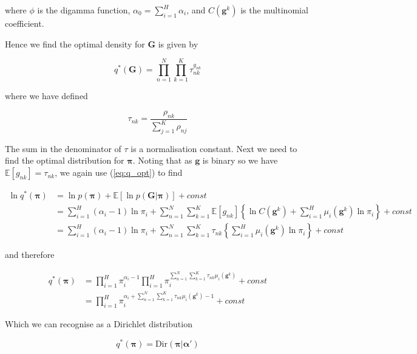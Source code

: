 \documentclass{article}
\begin{document}
where $\phi$ is the digamma function, $\alpha_0 = \sum_{i = 1}^H \alpha_i$, and $C(\boldsymbol{g}^k)$ is the multinomial coefficient.

Hence we find the optimal density for $\boldsymbol{G}$ is given by

\begin{equation}
q^*(\boldsymbol{G}) = \prod_{n = 1}^N \prod_{k = 1}^K \tau_{nk}^{g_{nk}}
\end{equation}

where we have defined

\begin{equation}
\tau_{nk} = \frac{\rho_{nk}}{\sum_{j = 1}^K \rho_{nj}}
\end{equation}

The sum in the denominator of $\tau$ is a normalisation constant. Next we need to find the optimal distribution for $\boldsymbol{\pi}$. Noting that as $\boldsymbol{g}$ is binary so we have $ \mathbb{E}[g_{nk}] = \tau_{nk}$, we again use (\ref{eq:q_opt}) to find

\begin{align}
    \ln q^*(\boldsymbol{\pi}) &= \ln p(\boldsymbol{\pi}) + \mathbb{E}[\ln p(\boldsymbol{G} | \boldsymbol{\pi})] + const\\
    &= \sum_{i = 1}^H (\alpha_i - 1) \ln \pi_i + \sum_{n = 1}^N \sum_{k = 1}^K \mathbb{E}[g_{nk}]\left\{ \ln C(\boldsymbol{g}^k) + \sum_{i = 1}^H \mu_i(\boldsymbol{g}^k) \ln \pi_i \right\} + const\\
    &= \sum_{i = 1}^H (\alpha_i - 1) \ln \pi_i + \sum_{n = 1}^N \sum_{k = 1}^K \tau_{nk} \left\{ \sum_{i = 1}^H \mu_i(\boldsymbol{g}^k) \ln \pi_i \right\} + const
\end{align}

and therefore

\begin{align}
    q^*(\boldsymbol{\pi}) &= \prod_{i = 1}^H \pi_i^{\alpha_i - 1} \prod_{i = 1}^H \pi_i^{\sum_{n = 1}^N \sum_{k = 1}^K \tau_{nk} \mu_i(\boldsymbol{g}^k)} + const\\
    &= \prod_{i = 1}^H \pi_i^{\alpha_i + \sum_{n = 1}^N \sum_{k = 1}^K \tau_{nk} \mu_i(\boldsymbol{g}^k) - 1} + const
\end{align}

Which we can recognise as a Dirichlet distribution

\begin{equation}
q^*(\boldsymbol{\pi}) = \text{Dir}(\boldsymbol{\pi} | \boldsymbol{\alpha}')
\end{equation}
\end{document}
